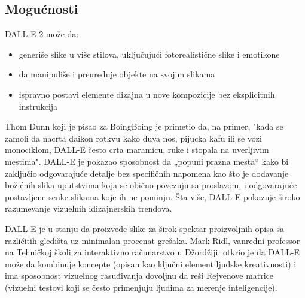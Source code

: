 \documentclass[a4paper]{article}
\begin{document}
\subsection{Mogućnosti}
\label{subsec:mogućnosti}

DALL-E 2 može da:
\begin{itemize}
\item generiše slike u više stilova, uključujući fotorealistične slike i emotikone
\item da manipuliše i preuređuje objekte na svojim slikama
\item ispravno postavi elemente dizajna u nove kompozicije bez eksplicitnih instrukcija
\end{itemize}

Thom Dunn koji je pisao za BoingBoing je primetio da, na primer, "kada se zamoli da nacrta daikon rotkvu kako duva nos, pijucka kafu ili se vozi monociklom, DALL-E često crta maramicu, ruke i stopala na uverljivim mestima". DALL-E je pokazao sposobnost da „popuni prazna mesta“ kako bi zaključio odgovarajuće detalje bez specifičnih napomena kao što je dodavanje božićnih slika uputstvima koja se obično povezuju sa proslavom, i odgovarajuće postavljene senke slikama koje ih ne pominju. Šta više, DALL-E pokazuje široko razumevanje vizuelnih idizajnerskih trendova\cite{3}.

DALL-E je u stanju da proizvede slike za širok spektar proizvoljnih opisa sa različitih gledišta uz minimalan procenat grešaka. Mark Ridl, vanredni professor na Tehničkoj školi za interaktivno računarstvo u Džordžiji, otkrio je da DALL-E može da kombinuje koncepte (opisan kao ključni element ljudske kreativnosti) i ima sposobnost vizuelnog rasuđivanja dovoljnu da reši Rejvenove matrice (vizuelni testovi koji se često primenjuju ljudima za merenje inteligencije).
\end{document}
